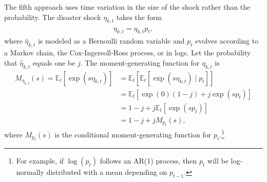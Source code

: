 \documentclass[12 pt, oneside]{article}
\theoremstyle{definition}
\theoremstyle{definition}
\theoremstyle{definition}
\newcommand{\E}{\mathbb{E}}
\begin{document}
The fifth approach uses time variation in the size of the shock rather than the probability. The disaster shock $\eta_{k, t}$ takes the form
\begin{align}
  \eta_{k, t} = \hat{\eta}_{k, t} p_t,
\end{align}
where $\hat{\eta}_{k, t}$ is modeled as a Bernoulli random variable and $p_t$ evolves according to a Markov chain, the Cox-Ingersoll-Ross process, or in logs. Let the probability that $\hat{\eta}_{k, t}$ equals one be $j$. The moment-generating function for $\eta_{k, t}$ is
\begin{align*}
  M_{\eta_{k, t}}(s) = \E_t[\exp(s \eta_{k, t})] & = \E_t[\E_t[\exp(s \eta_{k, t}) \mid p_t]]\\
                                                 & = \E_t[\exp(0)(1 - j) + j \exp( s p_t)]\\
                                                 & = 1 - j + j\E_t[\exp(s p_t)]\\
                                                 & = 1 - j + j M_{p_t}(s),
\end{align*}
where $M_{p_t}(s)$ is the conditional moment-generating function for $p_t$.\footnote{For example, if $\log(p_t)$ follows an AR(1) process, then $p_t$ will be log-normally distributed with a mean depending on $p_{t - 1}$.}
\end{document}
